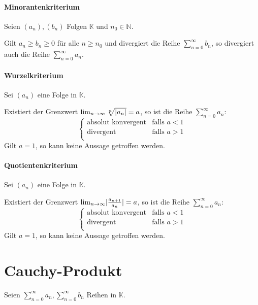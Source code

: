 		\paragraph{Minorantenkriterium}
			Seien $ (a _ n), (b _ n) $ Folgen $ \mathbb{K} $ und $ n _ 0 \in \mathbb{N} $.

			Gilt $ a _ n \geq b _ n \geq 0 $ für alle $ n \geq n _ 0 $ und divergiert die Reihe $ \sum _ { n = 0 } ^ \infty b _ n $, so divergiert auch die Reihe $ \sum _ { n = 0 } ^ \infty a _ n $.

		\paragraph{Wurzelkriterium}
			Sei $ (a _ n) $ eine Folge in $ \mathbb{K} $.

			Existiert der Grenzwert $ \lim_{n \to \infty} \sqrt[n]{\lvert a _ n \rvert} = a $, so ist die Reihe $ \sum _ { n = 0 } ^ \infty a _ n $:
			\begin{equation}
				\begin{cases}
					\text{absolut konvergent} & \text{falls } a < 1 \\
					\text{divergent}          & \text{falls } a > 1 \\
				\end{cases}
			\end{equation}
			\indent Gilt $ a = 1 $, so kann keine Aussage getroffen werden.

		\paragraph{Quotientenkriterium}
			Sei $ (a _ n) $ eine Folge in $ \mathbb{K} $.

			Existiert der Grenzwert $ \lim_{n \to \infty} \lvert \frac{a _ { n + 1 }}{a _ n} \rvert = a $, so ist die Reihe $ \sum _ { n = 0 } ^ \infty a _ n $:
			\begin{equation*}
				\begin{cases}
					\text{absolut konvergent} & \text{falls } a < 1 \\
					\text{divergent}          & \text{falls } a > 1 \\
				\end{cases}
			\end{equation*}
			\indent Gilt $ a = 1 $, so kann keine Aussage getroffen werden.

	\section{Cauchy-Produkt}
		Seien $ \sum _ { n = 0 } ^ { \infty } a _ n, \sum _ { n = 0 } ^ \infty b _ n $ Reihen in $ \mathbb{K} $.

